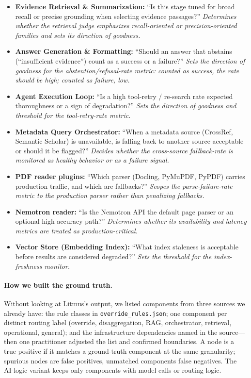 \documentclass[11pt]{article}
\begin{document}
\begin{itemize}
\item \textbf{Evidence Retrieval \& Summarization:} ``Is this stage tuned for broad recall or precise grounding when selecting evidence passages?'' \emph{Determines whether the retrieval judge emphasizes recall-oriented or precision-oriented families and sets its direction of goodness.}
\item \textbf{Answer Generation \& Formatting:} ``Should an answer that abstains (``insufficient evidence'') count as a success or a failure?'' \emph{Sets the direction of goodness for the abstention/refusal-rate metric: counted as success, the rate should be high; counted as failure, low.}
\item \textbf{Agent Execution Loop:} ``Is a high tool-retry / re-search rate expected thoroughness or a sign of degradation?'' \emph{Sets the direction of goodness and threshold for the tool-retry-rate metric.}
\item \textbf{Metadata Query Orchestrator:} ``When a metadata source (CrossRef, Semantic Scholar) is unavailable, is falling back to another source acceptable or should it be flagged?'' \emph{Decides whether the cross-source fallback-rate is monitored as healthy behavior or as a failure signal.}
\item \textbf{PDF reader plugins:} ``Which parser (Docling, PyMuPDF, PyPDF) carries production traffic, and which are fallbacks?'' \emph{Scopes the parse-failure-rate metric to the production parser rather than penalizing fallbacks.}
\item \textbf{Nemotron reader:} ``Is the Nemotron API the default page parser or an optional high-accuracy path?'' \emph{Determines whether its availability and latency metrics are treated as production-critical.}
\item \textbf{Vector Store (Embedding Index):} ``What index staleness is acceptable before results are considered degraded?'' \emph{Sets the threshold for the index-freshness monitor.}
\end{itemize}

\paragraph{How we built the ground truth.}
Without looking at Litmus's output, we listed components from three sources we already have: the rule classes in \texttt{override\_rules.json}; one component per distinct routing label (override, disaggregation, RAG, orchestrator, retrieval, operational, general); and the infrastructure dependencies named in the source---then one practitioner adjusted the list and confirmed boundaries. A node is a true positive if it matches a ground-truth component at the same granularity; spurious nodes are false positives, unmatched components false negatives. The AI-logic variant keeps only components with model calls or routing logic.
\end{document}
